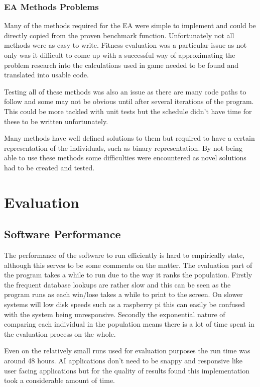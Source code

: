 \documentclass[a4paper]{article}
\begin{document}
\subsubsection{EA Methods Problems}
Many of the methods required for the EA were simple to implement and could be directly copied from the proven benchmark function.
Unfortunately not all methods were as easy to write.
Fitness evaluation was a particular issue as not only was it difficult to come up with a successful way of approximating the problem research into the calculations used in game needed to be found and translated into usable code.
\par
Testing all of these methods was also an issue as there are many code paths to follow and some may not be obvious until after several iterations of the program.
This could be more tackled with unit tests but the schedule didn't have time for these to be written unfortunately.
\par
Many methods have well defined solutions to them but required to have a certain representation of the individuals, such as binary representation.
By not being able to use these methods some difficulties were encountered as novel solutions had to be created and tested.
\section{Evaluation}
\subsection{Software Performance}
The performance of the software to run efficiently is hard to empirically state, although this serves to be some comments on the matter.
The evaluation part of the program takes a while to run due to the way it ranks the population.
Firstly the frequent database lookups are rather slow and this can be seen as the program runs as each win/lose takes a while to print to the screen.
On slower systems will low disk speeds such as a raspberry pi this can easily be confused with the system being unresponsive.
Secondly the exponential nature of comparing each individual in the population means there is a lot of time spent in the evaluation process on the whole.
\par
Even on the relatively small runs used for evaluation purposes the run time was around 48 hours.
AI applications don't need to be snappy and responsive like user facing applications but for the quality of results found this implementation took a considerable amount of time.
\end{document}
